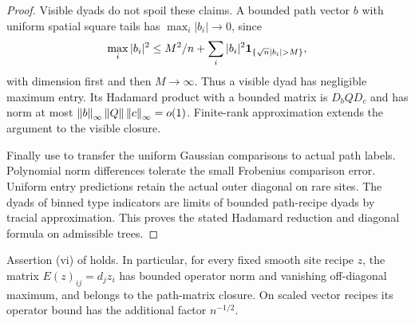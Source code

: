 \begin{proof}
Visible dyads do not spoil these claims.  A bounded path vector $b$
with uniform spatial square tails has
$\max_i|b_i|\to0$, since
\[
 \max_i|b_i|^2
 \le M^2/n+\sum_i|b_i|^2\1_{\{\sqrt n|b_i|>M\}},
\]
with dimension first and then $M\to\infty$.  Thus a visible dyad
has negligible maximum entry.  Its Hadamard product with a bounded
matrix is $D_bQD_c$ and has norm at most
$\left\lVert b\right\rVert_\infty\left\lVert Q\right\rVert\left\lVert c\right\rVert_\infty=o(1)$.
Finite-rank approximation extends the argument to the visible closure.

Finally use  to transfer
the uniform Gaussian comparisons to actual path labels.  Polynomial
norm differences tolerate the small Frobenius comparison error.
Uniform entry predictions retain the actual outer diagonal on rare
sites.  The dyads of binned type indicators are limits of bounded
path-recipe dyads by tracial approximation.  This proves the stated
Hadamard reduction and diagonal formula on admissible trees.
\end{proof}

\begin{lemma}
\label{lem:path-difference-closure}
Assertion \textup{(vi)} of  holds.  In particular,
for every fixed smooth site recipe $z$, the matrix
$E(z)_{ij}=d_jz_i$ has bounded operator norm and vanishing off-diagonal
maximum, and belongs to the path-matrix closure.  On scaled vector
recipes its operator bound has the additional factor $n^{-1/2}$.
\end{lemma}

